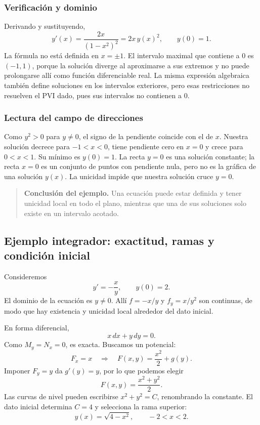 \documentclass[12pt,a4paper]{article}
\begin{document}
	\subsubsection*{Verificación y dominio}

	Derivando y sustituyendo,
	\[
	y'(x)=\frac{2x}{(1-x^2)^2}=2x\,y(x)^2,
	\qquad y(0)=1.
	\]
	La fórmula no está definida en \(x=\pm1\). El intervalo maximal que contiene a \(0\) es \((-1,1)\), porque la solución diverge al aproximarse a sus extremos y no puede prolongarse allí como función diferenciable real. La misma expresión algebraica también define soluciones en los intervalos exteriores, pero esas restricciones no resuelven el PVI dado, pues sus intervalos no contienen a \(0\).

	\subsubsection*{Lectura del campo de direcciones}

	Como \(y^2>0\) para \(y\neq0\), el signo de la pendiente coincide con el de \(x\). Nuestra solución decrece para \(-1<x<0\), tiene pendiente cero en \(x=0\) y crece para \(0<x<1\). Su mínimo es \(y(0)=1\).
	La recta \(y=0\) es una solución constante; la recta \(x=0\) es un conjunto de puntos con pendiente nula, pero no es la gráfica de una solución \(y(x)\). La unicidad impide que nuestra solución cruce \(y=0\).

	\begin{quote}
		\textbf{Conclusión del ejemplo.} Una ecuación puede estar definida y tener unicidad local en todo el plano, mientras que una de sus soluciones solo existe en un intervalo acotado.
	\end{quote}

	\clearpage
	\subsection{Ejemplo integrador: exactitud, ramas y condición inicial}

	Consideremos
	\[
	y'=-\frac{x}{y},\qquad y(0)=2.
	\]
	El dominio de la ecuación es \(y\neq0\). Allí \(f=-x/y\) y \(f_y=x/y^2\) son continuas, de modo que hay existencia y unicidad local alrededor del dato inicial.

	En forma diferencial,
	\[
	x\,dx+y\,dy=0.
	\]
	Como \(M_y=N_x=0\), es exacta. Buscamos un potencial:
	\[
	F_x=x
	\quad\Longrightarrow\quad
	F(x,y)=\frac{x^2}{2}+g(y).
	\]
	Imponer \(F_y=y\) da \(g'(y)=y\), por lo que podemos elegir
	\[
	F(x,y)=\frac{x^2+y^2}{2}.
	\]
	Las curvas de nivel pueden escribirse \(x^2+y^2=C\), renombrando la constante. El dato inicial determina \(C=4\) y selecciona la rama superior:
	\[
	\boxed{y(x)=\sqrt{4-x^2},\qquad -2<x<2.}
	\]
\end{document}

